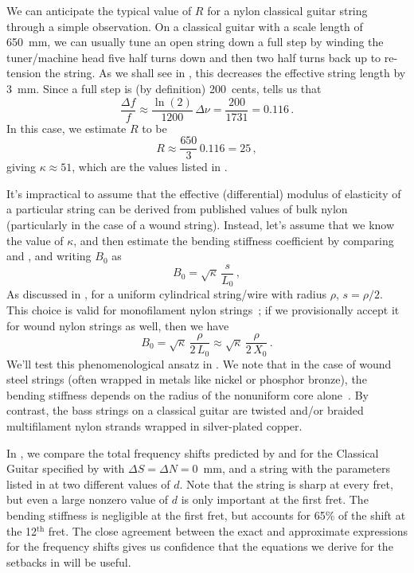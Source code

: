  We can anticipate the typical value of $R$ for a nylon classical guitar string through a simple observation. On a classical guitar with a scale length of 650~mm, we can usually tune an open string down a full step by winding the tuner/machine head five half turns down and then two half turns back up to re-tension the string. As we shall see in , this decreases the effective string length by 3~mm. Since a full step is (by definition) 200~cents,  tells us that
\begin{equation}
  \frac{\Delta f}{f} \approx \frac{\ln(2)}{1200}\, \Delta \nu = \frac{200}{1731} = 0.116\, .
\end{equation}
In this case, we estimate $R$ to be
\begin{equation}
  R \approx \frac{650}{3}\, 0.116 = 25\, ,
\end{equation}
giving $\kappa \approx 51$, which are the values listed in . 

It's impractical to assume that the effective (differential) modulus of elasticity of a particular string can be derived from published values of bulk nylon (particularly in the case of a wound string). Instead, let's assume that we know the value of $\kappa$, and then estimate the bending stiffness coefficient by comparing  and , and writing $B_0$ as
\begin{equation}
  B_0 = \sqrt{\kappa}\, \frac{s}{L_0}\, ,
\end{equation}
As discussed in , for a uniform cylindrical string/wire with radius $\rho$, $s = \rho/2$. This choice is valid for monofilament nylon strings~\cite{ref:woodland2004pgt}; if we provisionally accept it for wound nylon strings as well, then we have
\begin{equation} \label{eqn:b_0_kappa}
  B_0 = \sqrt{\kappa}\, \frac{\rho}{2\, L_0} \approx \sqrt{\kappa}\, \frac{\rho}{2\, X_0}\, .
\end{equation}
We'll test this phenomenological ansatz in . We note that in the case of wound steel strings (often wrapped in metals like nickel or phosphor bronze), the bending stiffness depends on the radius of the nonuniform core alone~\cite{ref:fletcher1964nvf,ref:kemp2020ibg}. By contrast, the bass strings on a classical guitar are twisted and/or braided multifilament nylon strands wrapped in silver-plated copper.

In , we compare the total frequency shifts predicted by  and  for the Classical Guitar specified by  with $\Delta S = \Delta N = 0$~mm, and a string with the parameters listed in  at two different values of $d$. Note that the string is sharp at every fret, but even a large nonzero value of $d$ is only important at the first fret. The bending stiffness is negligible at the first fret, but accounts for 65\% of the shift at the 12$^\textrm{th}$ fret. The close agreement between the exact and approximate expressions for the frequency shifts gives us confidence that the equations we derive for the setbacks in  will be useful.

